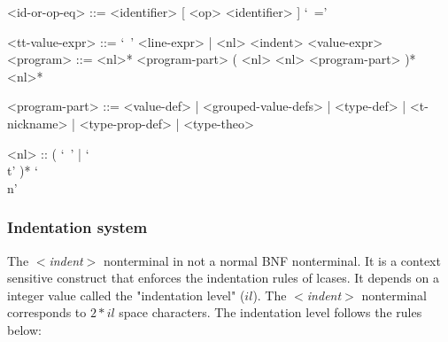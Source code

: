 \documentclass{article}
\begin{document}
\begin{grammar}
<id-or-op-eq> ::= <identifier> [ <op> <identifier> ] `\ ='

<tt-value-expr> ::= `\ ' <line-expr> | <nl> <indent> <value-expr>
\\

<program> ::=
<nl>* <program-part> ( <nl> <nl> <program-part> )* <nl>*

<program-part> ::=
<value-def> | <grouped-value-defs> | <type-def> | <t-nickname> | <type-prop-def> |
<type-theo>

<nl> :: ( `\ ' | `\\t' )* `\\n'
\end{grammar}

\subsubsection{Indentation system}
\label{subsubsec:indsys}

The \textit{$<$indent$>$} nonterminal in not a normal BNF nonterminal. It is a
context sensitive construct that enforces the indentation rules of lcases.
It depends on a integer value called the "indentation level" ($il$).
The \textit{$<$indent$>$} nonterminal corresponds to $2*il$ space characters.
The indentation level follows the rules below:
\end{document}
